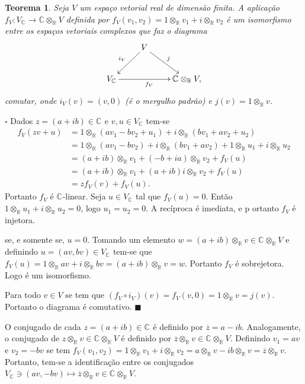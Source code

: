 \documentclass[12pt]{book}
\newtheorem{teorema}{Teorema}[section]
\newenvironment{prova}[1]{$\square$ #1}{\hfill$\blacksquare$}
\newcommand{\complexificacao}[1]{#1_{\complexo{}}}
\newcommand{\complexificacaotensorial}[1]{\complexo{}\otimes_{\reta} #1}
\newcommand{\complexificacaoelemento}[2]{#1\otimes_{\reta} #2}
\newcommand{\complexo}[1]{\mathbb{C}^{#1}}
\newcommand{\real}[1]{\mathbb{R}^{#1}}
\newcommand{\reta}{\real{}}
\begin{document}
	\begin{teorema}\label{teorema_isomorfismo_complexificacao}
		Seja $V$ um espaço vetorial real de dimensão finita. A aplicação $f_{V}: \complexificacao{V} \to \complexificacaotensorial{V}$ definida por  $f_{V}(v_{1},v_{2}) = 1\otimes_{\reta} v_{1} + i \otimes_{\reta} v_{2}$ é um isomorfismo entre os espaços vetoriais complexos que faz o diagrama
		$$
		\xymatrix{
			& V\ar[dl]_{i_{V}}\ar[rd]^{j} &
			\\
			\complexificacao{V}\ar[rr]_{f_{V}}& & \complexificacaotensorial{V},
		}
		$$
		comutar, onde $i_{V}(v) = (v,0)$ (é o mergulho padrão) e $j(v) = 1\otimes_{\reta} v$.
	\end{teorema}
	\begin{prova}
		Dados $z=(a+ib) \in \complexo{}$ e $v,u \in \complexificacao{V}$ tem-se
		$$
		\begin{aligned}
		f_{V}(zv+u) &= 1\otimes_{\reta} (a v_{1} - bv_{2} + u_{1}) + i \otimes_{\reta} (bv_{1}+av_{2} + u_{2})
		\\
		&=1\otimes_{\reta} (a v_{1} - bv_{2}) + i \otimes_{\reta} (bv_{1}+av_{2})+1\otimes_{\reta} u_{1} + i \otimes_{\reta} u_{2}
		\\
		&=(a+ib)\otimes_{\reta}v_{1} + (-b+ia)\otimes_{\reta} v_{2}+f_{V}(u)
		\\
		&=(a+ib)\otimes_{\reta}v_{1} + (a+ib)i\otimes_{\reta} v_{2}+f_{V}(u)
		\\
		&=zf_{V}(v)+f_{V}(u).
		\end{aligned}
		$$
		Portanto $f_{V}$ é $\complexo{}$-linear. Seja $u \in \complexificacao{V}$ tal que $f_{V}(u) = 0$. Então $1\otimes_{\reta}u_{1}+i\otimes_{\reta} u_{2}=0$, logo $u_{1}=u_{2}=0$. A recíproca é imediata, e p
		ortanto $f_{V}$ é injetora.
		
		
		 se, e somente se, $u = 0$. Tomando um elemento $w = (a+ib)\otimes_{\reta}v \in \complexificacaotensorial{V} $ e definindo $u = (av, bv) \in \complexificacao{V}$ tem-se que $f_{V}(u) = \complexificacaoelemento{1}{av} +\complexificacaoelemento{i}{bv} = (a+ib)\otimes_{\reta} v = w$. Portanto $f_{V}$ é sobrejetora. Logo é um isomorfismo.
		
		Para todo $v \in V$ se tem que $(f_{V}\circ i_{V})(v) = f_{V}(v, 0) = 1\otimes_{\reta} v = j(v)$. Portanto o diagrama é comutativo.
	\end{prova}
	
	O conjugado de cada $z=(a+ib) \in \complexo{}$ é definido por $\overline{z} = a-ib$. Analogamente, o conjugado de $\complexificacaoelemento{z}{v} \in \complexificacaotensorial{V}$ é definido por $\complexificacaoelemento{\overline{z}}{v} \in \complexificacaotensorial{V}$. Definindo $v_{1} =av$ e $v_{2} = -bv$ se tem $f_{V}(v_{1}, v_{2}) =\complexificacaoelemento{1}{v_{1}} +\complexificacaoelemento{i}{v_{2}} = \complexificacaoelemento{a}{v} -\complexificacaoelemento{ib}{v}  =\complexificacaoelemento{\overline{z}}{v}  $. Portanto, tem-se a identificação entre os conjugados $ \complexificacao{V} \ni (av, -bv) \mapsto \complexificacaoelemento{\overline{z}}{v} \in \complexificacaotensorial{V}$.
	
\end{document}
